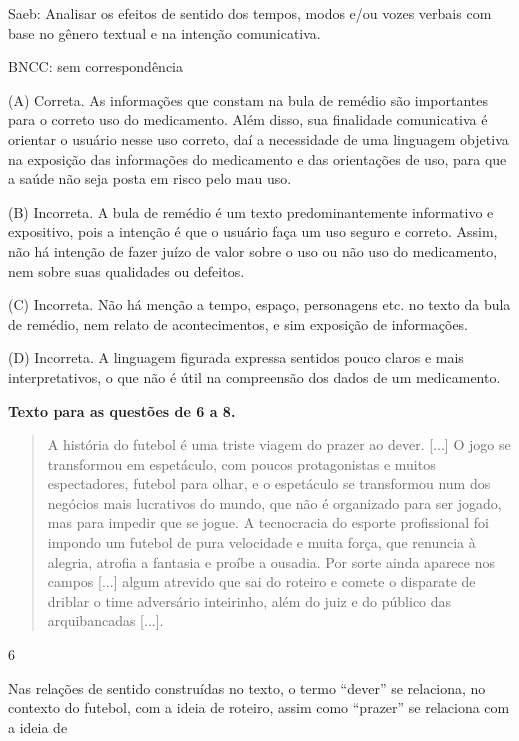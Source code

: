 Saeb: Analisar os efeitos de sentido dos tempos, modos e/ou vozes
verbais com base no gênero textual e na intenção comunicativa.

BNCC: sem correspondência

(A) Correta. As informações que constam na bula de remédio são
importantes para o correto uso do medicamento. Além disso, sua
finalidade comunicativa é orientar o usuário nesse uso correto, daí a
necessidade de uma linguagem objetiva na exposição das informações do
medicamento e das orientações de uso, para que a saúde não seja posta em
risco pelo mau uso.

(B) Incorreta. A bula de remédio é um texto predominantemente
informativo e expositivo, pois a intenção é que o usuário faça um uso
seguro e correto. Assim, não há intenção de fazer juízo de valor sobre o
uso ou não uso do medicamento, nem sobre suas qualidades ou defeitos.

(C) Incorreta. Não há menção a tempo, espaço, personagens etc. no texto
da bula de remédio, nem relato de acontecimentos, e sim exposição de
informações.

(D) Incorreta. A linguagem figurada expressa sentidos pouco claros e
mais interpretativos, o que não é útil na compreensão dos dados de um
medicamento.

\textbf{Texto para as questões de 6 a 8.}

\begin{quote}
A história do futebol é uma triste viagem do prazer ao dever. {[}...{]}
O jogo se transformou em espetáculo, com poucos protagonistas e muitos
espectadores, futebol para olhar, e o espetáculo se transformou num dos
negócios mais lucrativos do mundo, que não é organizado para ser jogado,
mas para impedir que se jogue. A tecnocracia do esporte profissional foi
impondo um futebol de pura velocidade e muita força, que renuncia à
alegria, atrofia a fantasia e proíbe a ousadia. Por sorte ainda aparece
nos campos {[}...{]} algum atrevido que sai do roteiro e comete o
disparate de driblar o time adversário inteirinho, além do juiz e do
público das arquibancadas {[}...{]}.
\end{quote}


\num{6}

Nas relações de sentido construídas no texto, o termo ``dever'' se
relaciona, no contexto do futebol, com a ideia de roteiro, assim como
``prazer'' se relaciona com a ideia de

